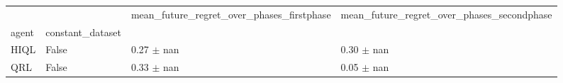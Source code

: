 \begin{tabular}{llll}
\toprule
 &  & mean_future_regret_over_phases_firstphase & mean_future_regret_over_phases_secondphase \\
agent & constant_dataset &  &  \\
\midrule
HIQL & False & 0.27 $\pm$ nan & 0.30 $\pm$ nan \\
\cline{1-4}
QRL & False & 0.33 $\pm$ nan & 0.05 $\pm$ nan \\
\cline{1-4}
\bottomrule
\end{tabular}

